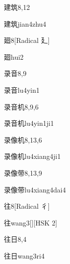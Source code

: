 \begin{entry}{建筑}{8,12}
  \begin{phonetics}{建筑}{jian4zhu4}
  \end{phonetics}
\end{entry}

\begin{entry}{廻}{8}[Radical 廴]
  \begin{phonetics}{廻}{hui2}
  \end{phonetics}
\end{entry}

\begin{entry}{录音}{8,9}
  \begin{phonetics}{录音}{lu4yin1}
  \end{phonetics}
\end{entry}

\begin{entry}{录音机}{8,9,6}
  \begin{phonetics}{录音机}{lu4yin1ji1}
  \end{phonetics}
\end{entry}

\begin{entry}{录像机}{8,13,6}
  \begin{phonetics}{录像机}{lu4xiang4ji1}
  \end{phonetics}
\end{entry}

\begin{entry}{录像带}{8,13,9}
  \begin{phonetics}{录像带}{lu4xiang4dai4}
  \end{phonetics}
\end{entry}

\begin{entry}{往}{8}[Radical 彳]
  \begin{phonetics}{往}{wang3}[][HSK 2]
  \end{phonetics}
\end{entry}

\begin{entry}{往日}{8,4}
  \begin{phonetics}{往日}{wang3ri4}
  \end{phonetics}
\end{entry}

